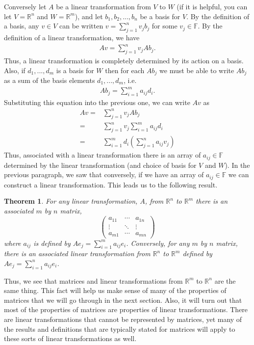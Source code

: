 \documentclass[12pt,reqno]{amsart}
\def\F{\mathbb{F}}
\def\R{\mathbb{R}}
\newcommand{\gmatrix}[1]{\begin{pmatrix} {#1}_{11} & \cdots &
    {#1}_{1n} \\ \vdots & \ddots & \vdots \\ {#1}_{m1} & \cdots &
    {#1}_{mn} \end{pmatrix}}
\newtheorem{theorem}{Theorem}[section]
\theoremstyle{definition}
\begin{document}
Conversely let $A$ be a linear transformation from $V$ to $W$ (if it
is helpful, you can let $V=\R^n$ and $W=\R^m$), and let $b_1, b_2,
..., b_n$ be a basis for $V$. By the definition of a basis, any $v \in
V$ can be written $v = \sum_{j=1}^n v_j b_j$ for some $v_j
\in \F$. By the definition of a linear transformation, we have
\begin{align*}
  A v = \sum_{j=1}^n v_j A b_j. 
\end{align*}
Thus, a linear transformation is completely determined by its action
on a basis. Also, if $d_1, ..., d_m$ is a basis for $W$ then for each
$A b_j$ we must be able to write $A b_j$ as a sum of the basis
elements $d_1, ..., d_m$, i.e.\
\begin{align*}
  A b_j = \sum_{i=1}^m a_{ij} d_i.
\end{align*}
Substituting this equation into the previous one, we can write $Av$ as
\begin{align*}
  Av = & \sum_{j=1}^n v_j A b_j \\
  = & \sum_{j=1}^n v_j \sum_{i=1}^m a_{ij} d_i \\
  = & \sum_{i=1}^m d_i \left( \sum_{j=1}^n a_{ij} v_j \right) 
\end{align*}
Thus, associated with a linear transformation there is an array of
$a_{ij} \in \F$ determined by the linear transformation (and choice of
basis for $V$ and $W$). In the previous paragraph, we saw that
conversely, if we have an array of $a_{ij} \in \F$ we can construct a
linear transformation. This leads us to the following result.
\begin{theorem}
  For any linear transformation, $A$, from $\R^n$ to $\R^m$ there is an
  associated $m$ by $n$ matrix,
  \[ 
  \gmatrix{a}
  \]
  where $a_{ij}$ is defined by $A e_j = \sum_{i=1}^m a_{ij}
  e_i$. Conversely, for any $m$ by $n$ matrix, there is an associated
  linear transformation from $\R^n$ to $\R^m$ defined by $A e_j =
  \sum_{i=1}^n a_{ij} e_i$.
\end{theorem}
Thus, we see that matrices and linear transformations from $\R^m$ to
$\R^n$ are the same thing. This fact will help us make sense of many
of the properties of matrices that we will go through in the next
section. Also, it will turn out that most of the properties of
matrices are properties of linear transformations. There are linear
transformations that cannot be represented by matrices, yet many of
the results and definitions that are typically stated for matrices
will apply to these sorts of linear transformations as well.
\end{document}
